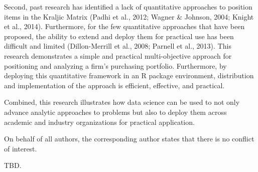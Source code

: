 \documentclass[twocolumn]{svjour3}       %
\begin{document}
Second, past research has identified a lack of quantitative approaches to position items in the Kraljic Matrix (Padhi et al., 2012; Wagner \& Johnson, 2004; Knight et al., 2014).  Furthermore, for the few quantitative approaches that have been proposed, the ability to extend and deploy them for practical use has been difficult and limited (Dillon-Merrill et al., 2008; Parnell et al., 2013). This research demonstrates a simple and practical multi-objective approach for positioning and analyzing a firm's purchasing portfolio. Furthermore, by deploying this quantitative framework in an R package environment, distribution and implementation of the approach is efficient, effective, and practical.

Combined, this research illustrates how data science can be used to not only advance analytic approaches to problems but also to deploy them across academic and industry organizations for practical application.

On behalf of all authors, the corresponding author states that there is no conflict of interest.



\begin{acknowledgements}
TBD.
\end{acknowledgements}

\end{document}
